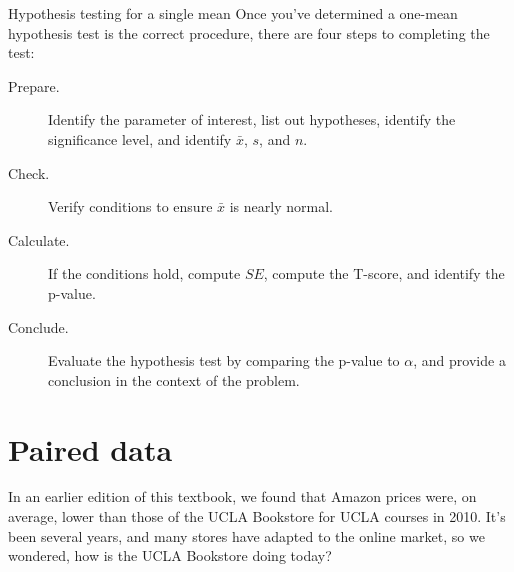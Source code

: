 
\begin{onebox}{Hypothesis testing for a single mean}
  Once you've determined a one-mean hypothesis test is the
  correct procedure, there are four steps to completing the
  test:
  \begin{description}
  \item[Prepare.]
      Identify the parameter of interest,
      list out hypotheses,
      identify the significance level,
      and identify $\bar{x}$, $s$, and $n$.
  \item[Check.]
      Verify conditions to ensure $\bar{x}$ is nearly normal.
  \item[Calculate.]
      If the conditions hold, compute $SE$,
      compute the T-score, and identify the p-value.
  \item[Conclude.]
      Evaluate the hypothesis test by comparing the p-value
      to $\alpha$, and provide a conclusion in the context
      of the problem.
  \end{description}
\end{onebox}



{}





\section{Paired data}
\label{pairedData}

\newcommand{\uclabookN}{68}
\newcommand{\uclabookDF}{67}
\newcommand{\uclabookM}{3.58}
\newcommand{\uclabookSD}{13.42}
\newcommand{\uclabookSE}{1.63}


\noindent%
In an earlier edition of this textbook,
we found that Amazon prices were, on average,
lower than those of the UCLA Bookstore for UCLA courses
in 2010.
It's been several years, and many stores have adapted
to the online market, so we wondered,
how is the UCLA Bookstore doing today?

